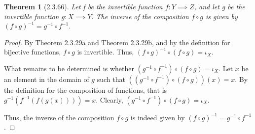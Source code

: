 \documentclass[a4paper, 12pt]{article}
\theoremstyle{plain}
\newtheorem*{theorem*}{Theorem}
\begin{document}
	
	\begin{theorem*}[2.3.66]
		Let f be the invertible function $f: Y \implies Z$, and let \newline g be the invertible function $g: X \implies Y$. The inverse of the composition $f \circ g$ is given by $(f \circ g)^{-1} = g^{-1} \circ f^{-1}$.
	\end{theorem*}
	
	\begin{proof}
		By Theorem 2.3.29a and Theorem 2.3.29b, and by the definition for bijective functions, $f \circ g$ is invertible. Thus, $(f \circ g)^{-1} \circ (f \circ g) = \iota_X$. 
		
		What remains to be  determined is whether $(g^{-1} \circ f^{-1}) \circ (f \circ g) = \iota_X$. Let $x$ be an element in the domain of $g$ such that $((g^{-1} \circ f^{-1}) \circ (f \circ g))(x) = x$. By the definition for the composition of functions, that is $g^{-1}(f^{-1}(f(g(x)))) = x$. Clearly, $(g^{-1} \circ f^{-1}) \circ (f \circ g) = \iota_X$.
		
		Thus, the inverse of the composition $f \circ g$ is indeed given by \newline $(f \circ g)^{-1} = g^{-1} \circ f^{-1}$.
		
	\end{proof}
\end{document}
